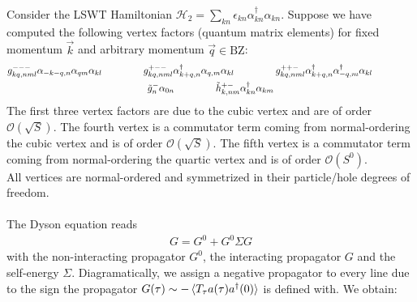 \documentclass{article}
\begin{document}
	
\noindent
Consider the LSWT Hamiltonian $\mathcal H_2 = \sum_{kn} \epsilon_{kn} \alpha_{kn}^\dagger \alpha_{kn}$.
Suppose we have computed the following vertex factors (quantum matrix elements) for fixed momentum $\vec k$ and arbitrary momentum $\vec q \in \mathrm{BZ}$:
\begin{gather}
	g^{---}_{kq,nml} \alpha_{-k-q,n} \alpha_{qm} \alpha_{kl} \hspace{1.5cm}
	g^{+--}_{kq,nml} \alpha_{k+q,n}^\dagger \alpha_{q,m} \alpha_{kl} \hspace{1.5cm}
	g^{++-}_{kq,nml} \alpha_{k+q,n}^\dagger \alpha_{-q,m}^\dagger \alpha_{kl} \hspace{1.5cm}
	\\
	\tilde g^{-}_{n} \alpha_{0n} \hspace{1.5cm}
	\tilde h^{+-}_{k,nm} \alpha_{kn}^\dagger \alpha_{km}
\end{gather}
The first three vertex factors are due to the cubic vertex and are of order $\mathcal O(\sqrt S)$.
The fourth vertex is a commutator term coming from normal-ordering the cubic vertex and is of order $\mathcal O(\sqrt S)$.
The fifth vertex is a commutator term coming from normal-ordering the quartic vertex and is of order $\mathcal O(S^0)$. \\
All vertices are normal-ordered and symmetrized in their particle/hole degrees of freedom.
\\
\\
The Dyson equation reads
\begin{align}
	G = G^0 + G^0 \Sigma G
\end{align}
with the non-interacting propagator $G^0$, the interacting propagator $G$ and the self-energy $\Sigma$.
Diagramatically, we assign a negative propagator to every line due to the sign the propagator $G(\tau) \sim -\braket{T_\tau a(\tau) a^\dagger(0)}$ is defined with. We obtain: \\
\end{document}
